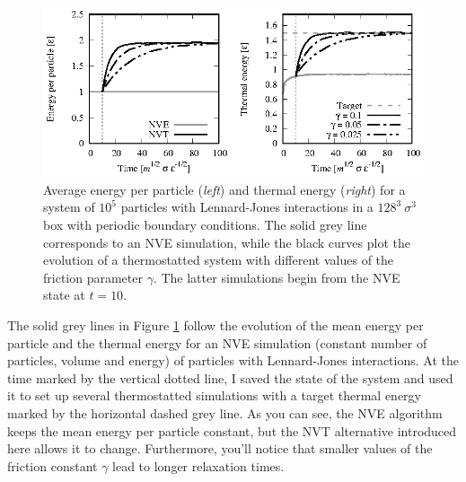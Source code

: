 \begin{figure}
  \begin{center}
    \includegraphics[width = \textwidth]{figures/Langevin.eps}
  \end{center}
  \caption{\label{Langevin}Average energy per particle (\textit{left}) and 
           thermal energy (\textit{right}) for a system of $10^5$ particles
           with Lennard-Jones interactions in a $128^3\ \sigma^3$ box with
           periodic boundary conditions. The solid grey line corresponds to an 
           NVE simulation, while the black curves plot the evolution of a 
           thermostatted system with different values of the friction parameter 
           $\gamma$. The latter simulations begin from the NVE state at
           $t = 10$.}
\end{figure}

The solid grey lines in Figure \ref{Langevin} follow the evolution of the mean 
energy per particle and the thermal energy for an NVE simulation (constant 
number of particles, volume and energy) of particles with Lennard-Jones 
interactions. At the time marked by the vertical dotted line, I saved the state 
of the system and used it to set up several thermostatted simulations with a 
target thermal energy marked by the horizontal dashed grey line. As you can see, 
the NVE algorithm keeps the mean energy per particle constant, but the NVT 
alternative introduced here allows it to change. Furthermore, you'll notice that 
smaller values of the friction constant $\gamma$ lead to longer relaxation 
times.


